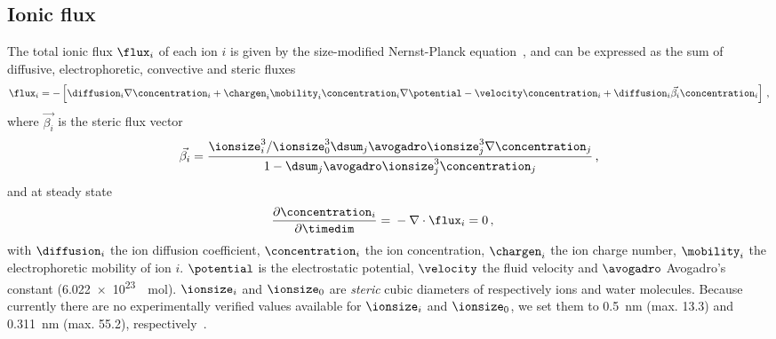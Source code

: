 \subsection{Ionic flux}
%

The total ionic flux $\flux_{i}$ of each ion $i$ is given by the size-modified Nernst-Planck
equation~\cite{Lu-2011}, and can be expressed as the sum of diffusive, electrophoretic, convective and steric
fluxes
%
\begin{align}
  \label{eq:sm-nernst-planck}
  \flux_{i} = -\left[
    \diffusion_{i} \nabla \concentration_{i}
    + \chargen_{i} \mobility_{i} \concentration_{i} \nabla \potential
    - \velocity \concentration_{i}
    + \diffusion_{i} \vec{\beta_{i}} \concentration_{i} \right]
  \text{\,,}
\end{align}
%
where $\vec{\beta_{i}}$ is the steric flux vector
%
\begin{align}
  \vec{\beta_{i}} =
      \frac{ \ionsize_{i}^3 / \ionsize_{0}^3 \dsum_{j} \avogadro \ionsize_{j}^3 \nabla \concentration_{j} }
          { 1 - \dsum_{j} \avogadro \ionsize_{j}^3 \concentration_{j} }
  \text{\,,}
\end{align}
%
and at steady state
%
\begin{align}
  \dfrac{\partial \concentration_{i}}{\partial \timedim} ={}& - \nabla \cdot \flux_{i} = 0
  \text{\,,}
\end{align}
%
with $\diffusion_{i}$ the ion diffusion coefficient, $\concentration_{i}$ the ion concentration,
$\chargen_{i}$ the ion charge number, $\mobility_{i}$ the electrophoretic mobility of ion $i$. $\potential$ is
the electrostatic potential, $\velocity$ the fluid velocity and $\avogadro$ Avogadro's constant
(\SI{6.022e23}{\per\mole}). $\ionsize_{i}$ and $\ionsize_{0}$ are \emph{steric} cubic diameters of
respectively ions and water molecules. Because currently there are no experimentally verified values available
for $\ionsize_{i}$ and $\ionsize_{0}$, we set them to \SI{0.5}{\nm} (max. \SI{13.3}{\Molar}) and
\SI{0.311}{\nm} (max. \SI{55.2}{\Molar}), respectively~\cite{Bazant-2009}.

